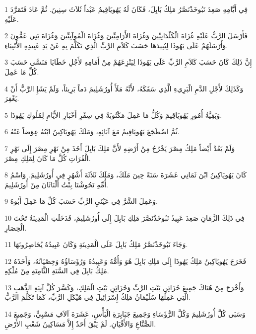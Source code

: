 \par 1 فِي أَيَّامِهِ صَعِدَ نَبُوخَذْنَصَّرُ مَلِكُ بَابِلَ، فَكَانَ لَهُ يَهُويَاقِيمُ عَبْداً ثَلاَثَ سِنِينَ. ثُمَّ عَادَ فَتَمَرَّدَ عَلَيْهِ.
\par 2 فَأَرْسَلَ الرَّبُّ عَلَيْهِ غُزَاةَ الْكَلْدَانِيِّينَ وَغُزَاةَ الأَرَامِيِّينَ وَغُزَاةَ الْمُوآبِيِّينَ وَغُزَاةَ بَنِي عَمُّونَ وَأَرْسَلَهُمْ عَلَى يَهُوذَا لِيُبِيدَهَا حَسَبَ كَلاَمِ الرَّبِّ الَّذِي تَكَلَّمَ بِهِ عَنْ يَدِ عَبِيدِهِ الأَنْبِيَاءِ.
\par 3 إِنَّ ذَلِكَ كَانَ حَسَبَ كَلاَمِ الرَّبِّ عَلَى يَهُوذَا لِيَنْزِعَهُمْ مِنْ أَمَامِهِ لأَجْلِ خَطَايَا مَنَسَّى حَسَبَ كُلِّ مَا عَمِلَ.
\par 4 وَكَذَلِكَ لأَجْلِ الدَّمِ الْبَرِيءِ الَّذِي سَفَكَهُ، لأَنَّهُ مَلَأَ أُورُشَلِيمَ دَماً بَرِيئاً، وَلَمْ يَشَإِ الرَّبُّ أَنْ يَغْفِرَ.
\par 5 وَبَقِيَّةُ أُمُورِ يَهُويَاقِيمَ وَكُلُّ مَا عَمِلَ مَكْتُوبَةٌ فِي سِفْرِ أَخْبَارِ الأَيَّامِ لِمُلُوكِ يَهُوذَا.
\par 6 ثُمَّ اضْطَجَعَ يَهُويَاقِيمُ مَعَ آبَائِهِ، وَمَلَكَ يَهُويَاكِينُ ابْنُهُ عِوَضاً عَنْهُ.
\par 7 وَلَمْ يَعُدْ أَيْضاً مَلِكُ مِصْرَ يَخْرُجُ مِنْ أَرْضِهِ لأَنَّ مَلِكَ بَابِلَ أَخَذَ مِنْ نَهْرِ مِصْرَ إِلَى نَهْرِ الْفُرَاتِ كُلَّ مَا كَانَ لِمَلِكِ مِصْرَ.
\par 8 كَانَ يَهُويَاكِينُ ابْنَ ثَمَانِي عَشَرَةَ سَنَةً حِينَ مَلَكَ، وَمَلَكَ ثَلاَثَةَ أَشْهُرٍ فِي أُورُشَلِيمَ. وَاسْمُ أُمِّهِ نَحُوشْتَا بِنْتُ أَلْنَاثَانَ مِنْ أُورُشَلِيمَ.
\par 9 وَعَمِلَ الشَّرَّ فِي عَيْنَيِ الرَّبِّ حَسَبَ كُلِّ مَا عَمِلَ أَبُوهُ.
\par 10 فِي ذَلِكَ الزَّمَانِ صَعِدَ عَبِيدُ نَبُوخَذْنَصَّرَ مَلِكِ بَابِلَ إِلَى أُورُشَلِيمَ، فَدَخَلَتِ الْمَدِينَةُ تَحْتَ الْحِصَارِ.
\par 11 وَجَاءَ نَبُوخَذْنَصَّرُ مَلِكُ بَابِلَ عَلَى الْمَدِينَةِ وَكَانَ عَبِيدُهُ يُحَاصِرُونَهَا.
\par 12 فَخَرَجَ يَهُويَاكِينُ مَلِكُ يَهُوذَا إِلَى مَلِكِ بَابِلَ هُوَ وَأُمُّهُ وَعَبِيدُهُ وَرُؤَسَاؤُهُ وَخِصْيَانُهُ، وَأَخَذَهُ مَلِكُ بَابِلَ فِي السَّنَةِ الثَّامِنَةِ مِنْ مُلْكِهِ.
\par 13 وَأَخْرَجَ مِنْ هُنَاكَ جَمِيعَ خَزَائِنِ بَيْتِ الرَّبِّ وَخَزَائِنِ بَيْتِ الْمَلِكِ، وَكَسَّرَ كُلَّ آنِيَةِ الذَّهَبِ الَّتِي عَمِلَهَا سُلَيْمَانُ مَلِكُ إِسْرَائِيلَ فِي هَيْكَلِ الرَّبِّ، كَمَا تَكَلَّمَ الرَّبُّ.
\par 14 وَسَبَى كُلَّ أُورُشَلِيمَ وَكُلَّ الرُّؤَسَاءِ وَجَمِيعَ جَبَابِرَةِ الْبَأْسِ، عَشَرَةَ آلاَفِ مَسْبِيٍّ، وَجَمِيعَ الصُّنَّاعِ وَالأَقْيَانِ. لَمْ يَبْقَ أَحَدٌ إِلاَّ مَسَاكِينُ شَعْبِ الأَرْضِ.
